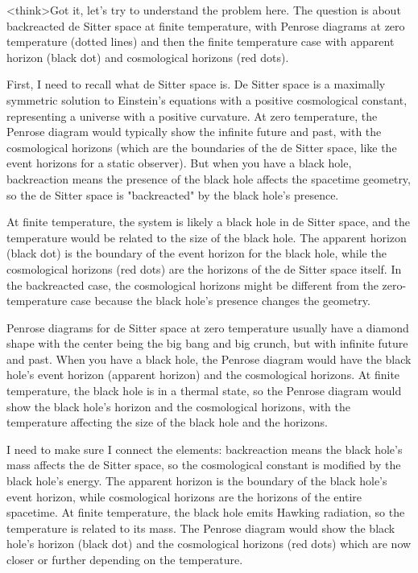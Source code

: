 <think>Got it, let's try to understand the problem here. The question is about backreacted de Sitter space at finite temperature, with Penrose diagrams at zero temperature (dotted lines) and then the finite temperature case with apparent horizon (black dot) and cosmological horizons (red dots). 

First, I need to recall what de Sitter space is. De Sitter space is a maximally symmetric solution to Einstein's equations with a positive cosmological constant, representing a universe with a positive curvature. At zero temperature, the Penrose diagram would typically show the infinite future and past, with the cosmological horizons (which are the boundaries of the de Sitter space, like the event horizons for a static observer). But when you have a black hole, backreaction means the presence of the black hole affects the spacetime geometry, so the de Sitter space is "backreacted" by the black hole's presence.

At finite temperature, the system is likely a black hole in de Sitter space, and the temperature would be related to the size of the black hole. The apparent horizon (black dot) is the boundary of the event horizon for the black hole, while the cosmological horizons (red dots) are the horizons of the de Sitter space itself. In the backreacted case, the cosmological horizons might be different from the zero-temperature case because the black hole's presence changes the geometry.

Penrose diagrams for de Sitter space at zero temperature usually have a diamond shape with the center being the big bang and big crunch, but with infinite future and past. When you have a black hole, the Penrose diagram would have the black hole's event horizon (apparent horizon) and the cosmological horizons. At finite temperature, the black hole is in a thermal state, so the Penrose diagram would show the black hole's horizon and the cosmological horizons, with the temperature affecting the size of the black hole and the horizons.

I need to make sure I connect the elements: backreaction means the black hole's mass affects the de Sitter space, so the cosmological constant is modified by the black hole's energy. The apparent horizon is the boundary of the black hole's event horizon, while cosmological horizons are the horizons of the entire spacetime. At finite temperature, the black hole emits Hawking radiation, so the temperature is related to its mass. The Penrose diagram would show the black hole's horizon (black dot) and the cosmological horizons (red dots) which are now closer or further depending on the temperature.

